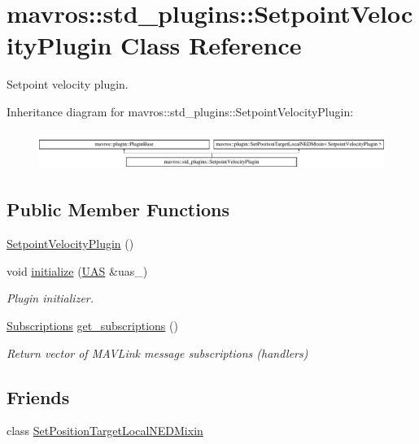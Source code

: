 \hypertarget{classmavros_1_1std__plugins_1_1SetpointVelocityPlugin}{}\section{mavros\+::std\+\_\+plugins\+::Setpoint\+Velocity\+Plugin Class Reference}
\label{classmavros_1_1std__plugins_1_1SetpointVelocityPlugin}


Setpoint velocity plugin.  


Inheritance diagram for mavros\+::std\+\_\+plugins\+::Setpoint\+Velocity\+Plugin\+:\begin{figure}[H]
\begin{center}
\leavevmode
\includegraphics[height=1.266968cm]{classmavros_1_1std__plugins_1_1SetpointVelocityPlugin}
\end{center}
\end{figure}
\subsection*{Public Member Functions}
\begin{DoxyCompactItemize}
\item 
\mbox{\hyperlink{group__plugin_ga9baa508ff9d450a25c0a0f46067bc6c0}{Setpoint\+Velocity\+Plugin}} ()
\item 
void \mbox{\hyperlink{group__plugin_ga0edbf48d95b744f3a8cb1741556541dc}{initialize}} (\mbox{\hyperlink{classmavros_1_1UAS}{U\+AS}} \&uas\+\_\+)
\begin{DoxyCompactList}\small\item\em Plugin initializer. \end{DoxyCompactList}\item 
\mbox{\hyperlink{group__plugin_ga8967d61fc77040e0c3ea5a4585d62a09}{Subscriptions}} \mbox{\hyperlink{group__plugin_ga63aa4be791ca2a5877ac7a1a6f4e881e}{get\+\_\+subscriptions}} ()
\begin{DoxyCompactList}\small\item\em Return vector of M\+A\+V\+Link message subscriptions (handlers) \end{DoxyCompactList}\end{DoxyCompactItemize}
\subsection*{Friends}
\begin{DoxyCompactItemize}
\item 
class \mbox{\hyperlink{group__plugin_gac6cc7d4f0f89ffc59d03574a47983861}{Set\+Position\+Target\+Local\+N\+E\+D\+Mixin}}
\end{DoxyCompactItemize}
